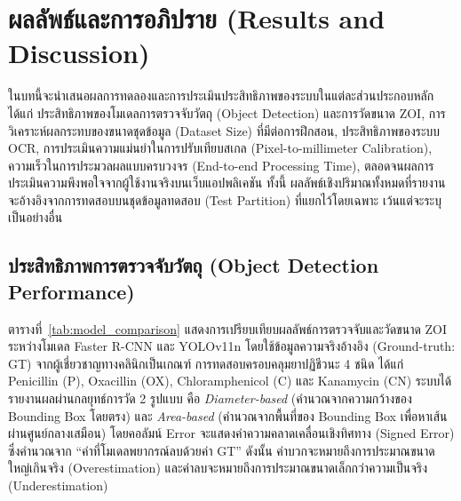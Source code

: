 \chapter{ผลลัพธ์และการอภิปราย (Results and Discussion)}

ในบทนี้จะนำเสนอผลการทดลองและการประเมินประสิทธิภาพของระบบในแต่ละส่วนประกอบหลัก ได้แก่ ประสิทธิภาพของโมเดลการตรวจจับวัตถุ (Object Detection) และการวัดขนาด ZOI, การวิเคราะห์ผลกระทบของขนาดชุดข้อมูล (Dataset Size) ที่มีต่อการฝึกสอน, ประสิทธิภาพของระบบ OCR, การประเมินความแม่นยำในการปรับเทียบสเกล (Pixel-to-millimeter Calibration), ความเร็วในการประมวลผลแบบครบวงจร (End-to-end Processing Time), ตลอดจนผลการประเมินความพึงพอใจจากผู้ใช้งานจริงบนเว็บแอปพลิเคชัน ทั้งนี้ ผลลัพธ์เชิงปริมาณทั้งหมดที่รายงานจะอ้างอิงจากการทดสอบบนชุดข้อมูลทดสอบ (Test Partition) ที่แยกไว้โดยเฉพาะ เว้นแต่จะระบุเป็นอย่างอื่น

\section{ประสิทธิภาพการตรวจจับวัตถุ (Object Detection Performance)}
\label{sec:detection_performance}

ตารางที่~\ref{tab:model_comparison} แสดงการเปรียบเทียบผลลัพธ์การตรวจจับและวัดขนาด ZOI ระหว่างโมเดล Faster R-CNN และ YOLOv11n โดยใช้ข้อมูลความจริงอ้างอิง (Ground-truth: GT) จากผู้เชี่ยวชาญทางคลินิกเป็นเกณฑ์ การทดสอบครอบคลุมยาปฏิชีวนะ 4 ชนิด ได้แก่ Penicillin (P), Oxacillin (OX), Chloramphenicol (C) และ Kanamycin (CN) ระบบได้รายงานผลผ่านกลยุทธ์การวัด 2 รูปแบบ คือ \emph{Diameter-based} (คำนวณจากความกว้างของ Bounding Box โดยตรง) และ \emph{Area-based} (คำนวณจากพื้นที่ของ Bounding Box เพื่อหาเส้นผ่านศูนย์กลางเสมือน) โดยคอลัมน์ Error จะแสดงค่าความคลาดเคลื่อนเชิงทิศทาง (Signed Error) ซึ่งคำนวณจาก ``ค่าที่โมเดลพยากรณ์ลบด้วยค่า GT'' ดังนั้น ค่าบวกจะหมายถึงการประมาณขนาดใหญ่เกินจริง (Overestimation) และค่าลบจะหมายถึงการประมาณขนาดเล็กกว่าความเป็นจริง (Underestimation)

